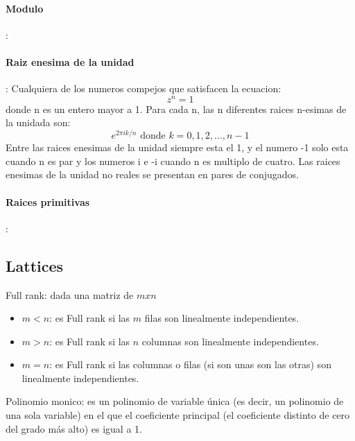 \documentclass[12pt, oneside]{article}
\begin{document}
\vspace{0.3cm}
\paragraph{Modulo}:

\vspace{0.3cm}
\paragraph{Raiz enesima de la unidad}:
Cualquiera de los numeros compejos que satisfacen la ecuacion:
\begin{equation*}
  z^n=1
\end{equation*}
donde n es un entero mayor a 1.
Para cada n, las n diferentes raices n-esimas de la unidada son:
\begin{equation*}
  e^{2\pi ik/n} \text{ donde } k=0,1,2,...,n-1
\end{equation*}
Entre las raices enesimas de la unidad siempre esta el 1, y el numero -1 solo
esta cuando n es par y los numeros i e -i cuando n es multiplo de cuatro.
Las raices enesimas de la unidad no reales se presentan en pares de conjugados.

\vspace{0.3cm}
\paragraph{Raices primitivas}:

\subsection{Lattices}

Full rank: dada una matriz de $m x n$
\begin{itemize}
  \item $m<n$: es Full rank si las $m$ filas son linealmente independientes.
  \item $m>n$: es Full rank si las $n$ columnas son linealmente independientes.
  \item $m=n$: es Full rank si las columnas o filas (si son unas son las otras) son
    linealmente independientes.
\end{itemize}

Polinomio monico:
es un polinomio de variable única (es decir, un polinomio de una sola variable)
en el que el coeficiente principal (el coeficiente distinto de cero del grado más alto) es igual a 1.
\end{document}
